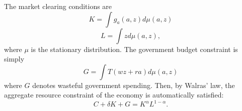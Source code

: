 \documentclass[12pt]{article}
\begin{document}
The market clearing conditions are%
\begin{equation*}
K=\int g_{a}\left( a,z\right) d\mu \left( a,z\right) 
\end{equation*}%
\begin{equation*}
L=\int zd\mu \left( a,z\right) ,
\end{equation*}%
where $\mu $ is the stationary distribution. The government budget
constraint is simply%
\begin{equation*}
G=\int T(wz+ra)d\mu (a,z)
\end{equation*}%
where $G$ denotes wasteful government spending. Then, by Walras' law, the
aggregate resource constraint of the economy is automatically satisfied:%
\begin{equation*}
C+\delta K+G=K^{\alpha }L^{1-\alpha }.
\end{equation*}
\end{document}

